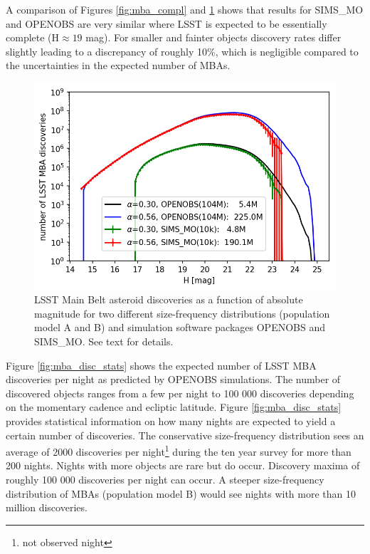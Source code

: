 A comparison of Figures \ref{fig:mba_compl} and \ref{fig:mba_disc} shows that results for SIMS\_MO and OPENOBS are very similar where \gls{LSST} is expected to be essentially complete (H$\approx19$ mag). For smaller and fainter objects discovery rates differ slightly leading to a discrepancy of roughly 10\%, which is negligible compared to the uncertainties in the expected number of MBAs. 
%
\begin{figure}[tb!]
\begin{center}
\includegraphics[scale=0.9]{figs/mba_disc3.png}
\end{center}
\caption{LSST Main Belt asteroid discoveries as a function of absolute magnitude for two different size-frequency distributions (population model A and \gls{B}) and simulation software packages OPENOBS and SIMS\_MO. See text for details.}
\label{fig:mba_disc}       %
\end{figure}
%
Figure \ref{fig:mba_disc_stats} shows the expected number of \gls{LSST} MBA discoveries per night as predicted by OPENOBS simulations. The number of discovered objects ranges from a few per night to 100 000 discoveries depending on the momentary cadence and ecliptic latitude. Figure \ref{fig:mba_disc_stats} provides statistical information on how many nights are expected to yield a certain number of discoveries. The conservative size-frequency distribution sees an average of 2000 discoveries per night\footnote{not observed night} during the ten year survey for more than 200 nights. Nights with more objects are rare but do occur. Discovery maxima of roughly 100 000 discoveries per night can occur. A steeper size-frequency distribution of MBAs (population model \gls{B}) would see nights with more than 10 million discoveries. 

